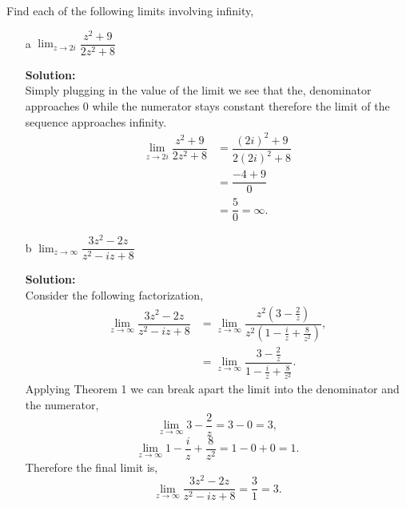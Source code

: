 \documentclass[12pt]{article}
\makeatletter
\theoremstyle{homework}
\newenvironment{exercise}[1]
{\def\@currentlabel{#1}\exercisecore}
{\endexercisecore}
\newcommand{\localhead}[1]{\par\smallskip\noindent\textbf{#1}\nobreak\\}%
\newcommand\solution{\localhead{Solution:}}
\makeatother
\begin{document}
\begin{exercise}{25} Find each of the following limits involving infinity,\\
  \begin{enumerate}
    \item[a]$\lim_{z \to 2i} \dfrac{z^2 + 9}{2z^2 + 8}$\\
    \solution Simply plugging in the value of the limit we see that the, 
    denominator approaches 0 while the numerator stays constant therefore the 
    limit of the sequence approaches infinity. 
    \begin{align*}
      \lim_{z \to 2i} \dfrac{z^2 + 9}{2z^2 + 8} &=  \dfrac{(2i)^2 + 9}{2(2i)^2 + 8}\\
      &= \dfrac{-4 + 9}{0}\\
      &= \dfrac{5}{0} = \infty. 
    \end{align*}
    \vspace{.15in}
    
  
    \item[b]$\lim_{z \to \infty} \dfrac{3z^2 - 2z}{z^2 - iz + 8}$\\
    \solution  Consider the following factorization, 
    \begin{align*}
      \lim_{z \to \infty} \dfrac{3z^2 - 2z}{z^2 - iz + 8} &= \lim_{z \to \infty} \dfrac{z^2(3 - \frac{2}{z})}{z^2(1 - \frac{i}{z} + \frac{8}{z^2})},\\
      &=\lim_{z \to \infty} \dfrac{3 - \frac{2}{z}}{1 - \frac{i}{z} + \frac{8}{z^2}}.
    \end{align*}
    Applying Theorem 1 we can break apart the limit into the denominator and the numerator, 
    \begin{equation*}
      \lim_{z \to \infty} 3 - \frac{2}{z} = 3 - 0 = 3,
    \end{equation*}
    \begin{equation*}
      \lim_{z \to \infty} 1 - \frac{i}{z} + \frac{8}{z^2} = 1 - 0 + 0 = 1.
    \end{equation*}
    Therefore the final limit is, 
    \begin{equation*}
      \lim_{z \to \infty} \dfrac{3z^2 - 2z}{z^2 - iz + 8} = \dfrac{3}{1} = 3. 
    \end{equation*}
  \end{enumerate}
  
\end{exercise}
\end{document}
